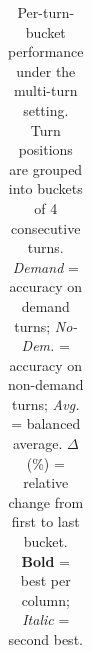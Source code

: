 \begin{table}[t]
{\begin{tabular}{@{}l|l|ccccccccccccccc|c@{}}
\bottomrule
\end{tabular}%
}
\caption{Per-turn-bucket performance under the multi-turn setting.
Turn positions are grouped into buckets of 4 consecutive turns.
\textit{Demand} = accuracy on demand turns;
\textit{No-Dem.} = accuracy on non-demand turns;
\textit{Avg.} = balanced average.
$\Delta$(\%) = relative change from first to last bucket.
\textbf{Bold} = best per column; \textit{Italic} = second best.}
\label{tab:turn_degradation}
\end{table}
